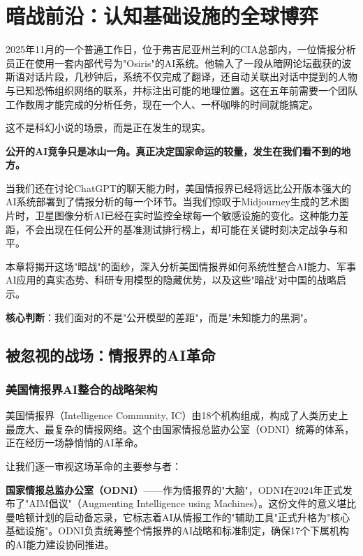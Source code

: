 \chapter{暗战前沿：认知基础设施的全球博弈}

2025年11月的一个普通工作日，位于弗吉尼亚州兰利的CIA总部内，一位情报分析员正在使用一套内部代号为"Osiris"的AI系统。他输入了一段从暗网论坛截获的波斯语对话片段，几秒钟后，系统不仅完成了翻译，还自动关联出对话中提到的人物与已知恐怖组织网络的联系，并标注出可能的地理位置。这在五年前需要一个团队工作数周才能完成的分析任务，现在一个人、一杯咖啡的时间就能搞定。

这不是科幻小说的场景，而是正在发生的现实。

\textbf{公开的AI竞争只是冰山一角。真正决定国家命运的较量，发生在我们看不到的地方。}

当我们还在讨论ChatGPT的聊天能力时，美国情报界已经将远比公开版本强大的AI系统部署到了情报分析的每一个环节。当我们惊叹于Midjourney生成的艺术图片时，卫星图像分析AI已经在实时监控全球每一个敏感设施的变化。这种能力差距，不会出现在任何公开的基准测试排行榜上，却可能在关键时刻决定战争与和平。

本章将揭开这场"暗战"的面纱，深入分析美国情报界如何系统性整合AI能力、军事AI应用的真实态势、科研专用模型的隐藏优势，以及这些"暗战"对中国的战略启示。

\textbf{核心判断}：我们面对的不是"公开模型的差距"，而是"未知能力的黑洞"。

\section{被忽视的战场：情报界的AI革命}

\subsection{美国情报界AI整合的战略架构}

美国情报界（Intelligence Community, IC）由18个机构组成，构成了人类历史上最庞大、最复杂的情报网络。这个由国家情报总监办公室（ODNI）统筹的体系，正在经历一场静悄悄的AI革命。

让我们逐一审视这场革命的主要参与者：

\textbf{国家情报总监办公室（ODNI）}——作为情报界的"大脑"，ODNI在2024年正式发布了"AIM倡议"（Augmenting Intelligence using Machines）。这份文件的意义堪比曼哈顿计划的启动备忘录，它标志着AI从情报工作的"辅助工具"正式升格为"核心基础设施"。ODNI负责统筹整个情报界的AI战略和标准制定，确保17个下属机构的AI能力建设协同推进。

